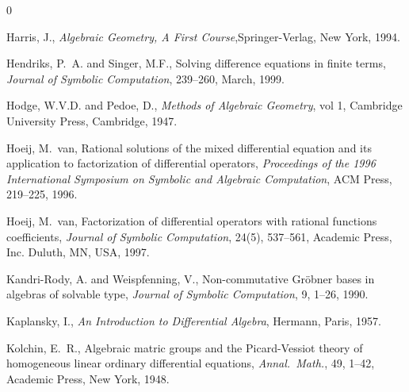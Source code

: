 \begin{thebibliography}{0}

Harris, J., {\em Algebraic Geometry, A First
Course},Springer-Verlag, New York, 1994.




Hendriks, P.~A. and Singer, M.F.,
 Solving difference equations in finite terms, {\em Journal of Symbolic Computation},
239--260,  March, 1999.

 Hodge, W.V.D. and Pedoe, D., {\em Methods of Algebraic Geometry},
vol 1, Cambridge University Press, Cambridge, 1947.

Hoeij, M.~van, Rational solutions of the mixed differential
equation and its application to factorization of
          differential operators, {\em
          Proceedings of the 1996 International Symposium on Symbolic and Algebraic Computation},
ACM Press,  219--225, 1996.

 Hoeij, M.~van, Factorization of differential operators with rational functions coefficients,{\em
 Journal of Symbolic Computation},
24(5),  537--561, Academic Press, Inc. Duluth, MN, USA, 1997.







Kandri-Rody, A. and Weispfenning, V., Non-commutative
{G}r{\"o}bner bases in algebras of solvable type,  {\em Journal of
Symbolic Computation}, 9, 1--26,  1990.





Kaplansky, I., {\em An Introduction to Differential Algebra},
Hermann, Paris, 1957.

 Kolchin, E.~R., Algebraic matric groups and the {P}icard-{V}essiot theory of
 homogeneous linear ordinary differential equations, {\em Annal.~Math.},
49, 1--42, Academic Press, New York, 1948.



\end{thebibliography}
